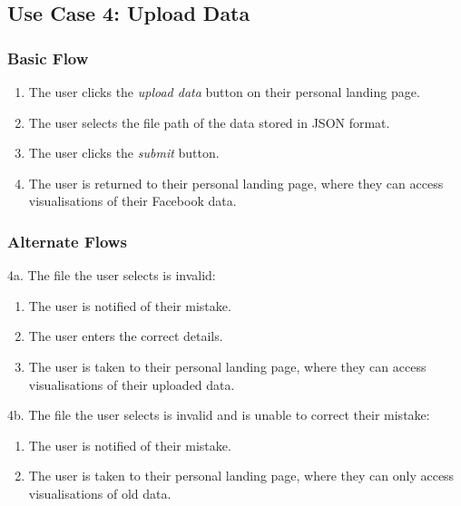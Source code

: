 \documentclass[12pt,onecolumn]{article}
\begin{document}
	\subsection{Use Case 4: Upload Data}

		\subsubsection{Basic Flow}

		\begin{enumerate}
			\item The user clicks the \emph{upload data} button on their personal landing page.

			\item The user selects the file path of the data stored in JSON format.

			\item The user clicks the \emph{submit} button.

			\item The user is returned to their personal landing page, where they can access visualisations of their Facebook data.		

		\end{enumerate}

		\subsubsection{Alternate Flows}

		4a. The file the user selects is invalid:

		\begin{enumerate}
			\item The user is notified of their mistake.

			\item The user enters the correct details.

			\item The user is taken to their personal landing page, where they can access visualisations of their uploaded data.
		\end{enumerate}

		4b. The file the user selects is invalid and is unable to correct their mistake:

		\begin{enumerate}
			\item The user is notified of their mistake.

			\item The user is taken to their personal landing page, where they can only access visualisations of old data.
		\end{enumerate}
\end{document}
